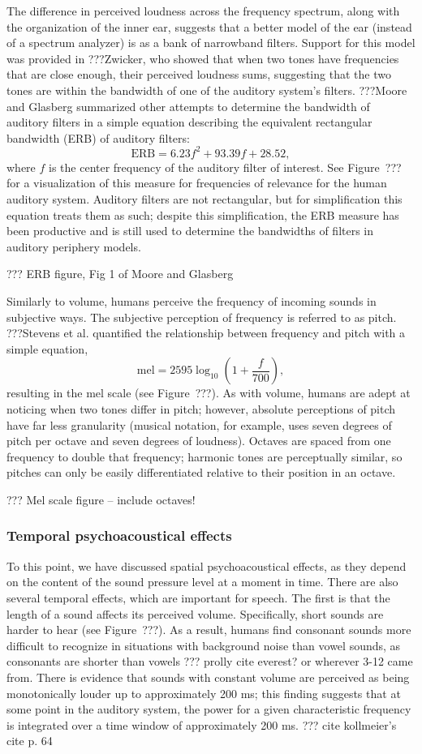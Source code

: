 The difference in perceived loudness
across the frequency spectrum,
along with the organization
of the inner ear,
suggests that a better model
of the ear (instead of a spectrum analyzer)
is as a bank of narrowband filters.
Support for this model was provided
in ???Zwicker,
who showed that when two tones
have frequencies that are close enough,
their perceived loudness sums,
suggesting that the two tones
are within the bandwidth of one of the
auditory system's filters.
???Moore and Glasberg
summarized other attempts to
determine the bandwidth
of auditory filters
in a simple equation
describing the equivalent
rectangular bandwidth (ERB)
of auditory filters:
$$\text{ERB} = 6.23 f^2 + 93.39 f + 28.52,$$
where $f$ is the center frequency
of the auditory filter of interest.
See Figure~??? for a visualization of
this measure for frequencies of relevance
for the human auditory system.
Auditory filters are not rectangular,
but for simplification this equation
treats them as such;
despite this simplification,
the ERB measure has been productive and is still used
to determine the bandwidths
of filters in auditory periphery models.

??? ERB figure, Fig 1 of Moore and Glasberg

Similarly to volume,
humans perceive
the frequency of incoming sounds
in subjective ways.
The subjective perception of frequency
is referred to as pitch.
???Stevens et al. quantified
the relationship between
frequency and pitch
with a simple equation,
$$\text{mel} = 2595 \log_{10} \left(1 + \frac{f}{700}\right),$$
resulting in the mel scale
(see Figure~???).
As with volume, humans are adept at
noticing when two tones differ in pitch;
however, absolute perceptions of pitch
have far less granularity
(musical notation, for example,
uses seven degrees of pitch per octave
and seven degrees of loudness).
Octaves are spaced from one frequency
to double that frequency;
harmonic tones are perceptually similar,
so pitches can only
be easily differentiated
relative to their position in an octave.

??? Mel scale figure -- include octaves!

\subsubsection{Temporal psychoacoustical effects}

To this point, we have discussed
spatial psychoacoustical effects,
as they depend on the content of
the sound pressure level
at a moment in time.
There are also several temporal effects,
which are important for speech.
The first is that the length
of a sound affects its perceived volume.
Specifically, short sounds are harder to hear
(see Figure~???).
As a result, humans find
consonant sounds more difficult
to recognize in situations with background noise
than vowel sounds,
as consonants are shorter than vowels
??? prolly cite everest? or wherever 3-12 came from.
There is evidence that sounds with constant volume
are perceived as being monotonically louder
up to approximately 200 ms;
this finding suggests that
at some point in the auditory system,
the power for a given characteristic frequency
is integrated over a time window
of approximately 200 ms.
??? cite kollmeier's cite p. 64

